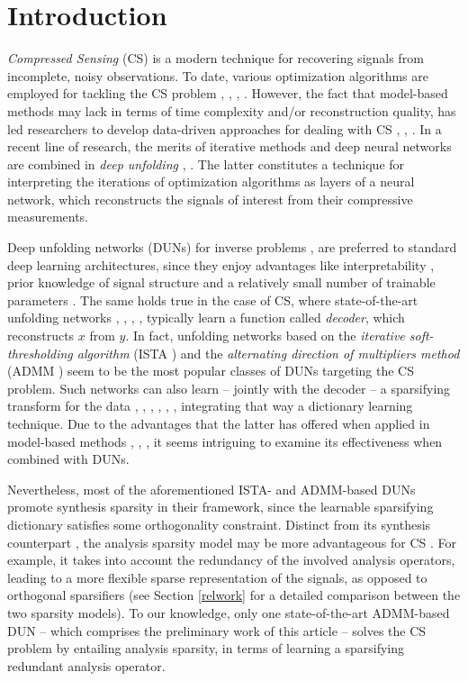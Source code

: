\documentclass[preprint,12pt]{elsarticle}
\begin{document}
\section{Introduction}
\label{intro}
\emph{Compressed Sensing} (CS) is a modern technique for recovering signals from incomplete, noisy observations. To date, various optimization algorithms are employed for tackling the CS problem \cite{irls}, \cite{daubechies}, \cite{fista}, \cite{boyd:5}. However, the fact that model-based methods may lack in terms of time complexity and/or reconstruction quality, has led researchers to develop data-driven approaches for dealing with CS \cite{romberg}, \cite{infocs}, \cite{transcs}. In a recent line of research, the merits of iterative methods and deep neural networks are combined in \emph{deep unfolding} \cite{unfolding}, \cite{unrolling}. The latter constitutes a technique for interpreting the iterations of optimization algorithms as layers of a neural network, which reconstructs the signals of interest from their compressive measurements.
\par Deep unfolding networks (DUNs) for inverse problems \cite{scarlett}, \cite{deadmm} are preferred to standard deep learning architectures, since they enjoy advantages like interpretability \cite{superres}, prior knowledge of signal structure \cite{wcs} and a relatively small number of trainable parameters \cite{mimo}. The same holds true in the case of CS, where state-of-the-art unfolding networks \cite{sista}, \cite{gendnn}, \cite{underwater}, \cite{unfoldenoise}, \cite{csc} typically learn a function called \emph{decoder}, which reconstructs $x$ from $y$. In fact, unfolding networks based on the \textit{iterative soft-thresholding algorithm} (ISTA \cite{daubechies}) and the \textit{alternating direction of multipliers method} (ADMM \cite{boyd:5}) seem to be the most popular classes of DUNs targeting the CS problem. Such networks can also learn -- jointly with the decoder -- a sparsifying transform for the data \cite{istagen}, \cite{ista-net}, \cite{admm-net}, \cite{ladmm}, \cite{admmdad}, \cite{tensoradmm}, integrating that way a dictionary learning technique. Due to the advantages that the latter has offered when applied in model-based methods \cite{1bitcs}, \cite{imagedl}, \cite{iot}, it seems intriguing to examine its effectiveness when combined with DUNs.
\par Nevertheless, most of the aforementioned ISTA- and ADMM-based DUNs promote synthesis sparsity \cite{rf} in their framework, since the learnable sparsifying dictionary satisfies some orthogonality constraint. Distinct from its synthesis counterpart \cite{cosparse}, the analysis sparsity model may be more advantageous for CS \cite{analvssyn}. For example, it takes into account the redundancy of the involved analysis operators, leading to a more flexible sparse representation of the signals, as opposed to orthogonal sparsifiers \cite{genzel} (see Section \ref{relwork} for a detailed comparison between the two sparsity models). To our knowledge, only one state-of-the-art  ADMM-based DUN \cite{admmdad} -- which comprises the preliminary work of this article -- solves the CS problem by entailing analysis sparsity, in terms of learning a sparsifying redundant analysis operator.
\end{document}
